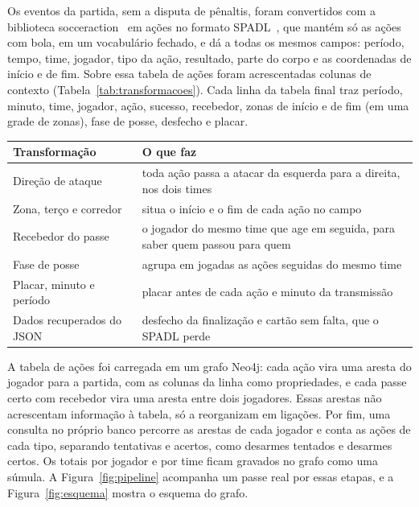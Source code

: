 Os eventos da partida, sem a disputa de pênaltis, foram convertidos com a biblioteca
socceraction~\cite{socceraction} em ações no formato SPADL~\cite{decroos2019actions}, que mantém só as ações com
bola, em um vocabulário fechado, e dá a todas os mesmos campos: período, tempo, time, jogador, tipo da ação,
resultado, parte do corpo e as coordenadas de início e de fim. Sobre essa tabela de ações foram acrescentadas
colunas de contexto (Tabela~\ref{tab:transformacoes}). Cada linha da tabela final traz período, minuto, time,
jogador, ação, sucesso, recebedor, zonas de início e de fim (em uma grade de \nZones{} zonas), fase de posse,
desfecho e placar.

\vspace{2mm}
\noindent\begin{minipage}{\columnwidth}
\centering\small\renewcommand{\arraystretch}{1.15}\setlength{\tabcolsep}{4pt}
\begin{tabular}{>{\raggedright\arraybackslash}p{}>{\raggedright\arraybackslash}p{}} %
\toprule
Transformação & O que faz \\
\midrule
Direção de ataque & toda ação passa a atacar da esquerda para a direita, nos dois times \\
Zona, terço e corredor & situa o início e o fim de cada ação no campo \\
Recebedor do passe & o jogador do mesmo time que age em seguida, para saber quem passou para quem \\
Fase de posse & agrupa em jogadas as ações seguidas do mesmo time \\
Placar, minuto e período & placar antes de cada ação e minuto da transmissão \\
Dados recuperados do JSON & desfecho da finalização e cartão sem falta, que o SPADL perde \\
\bottomrule
\end{tabular}
\label{tab:transformacoes}
\end{minipage}\par\smallskip

A tabela de ações foi carregada em um grafo Neo4j: cada ação vira uma aresta do jogador para a partida, com as
colunas da linha como propriedades, e cada passe certo com recebedor vira uma aresta entre dois jogadores. Essas
arestas não acrescentam informação à tabela, só a reorganizam em ligações. Por fim, uma consulta no próprio banco
percorre as arestas de cada jogador e conta as ações de cada tipo, separando tentativas e acertos, como desarmes
tentados e desarmes certos. Os totais por jogador e por time ficam gravados no grafo como uma súmula. A
Figura~\ref{fig:pipeline} acompanha um passe real por essas etapas, e a Figura~\ref{fig:esquema} mostra o esquema
do grafo.

